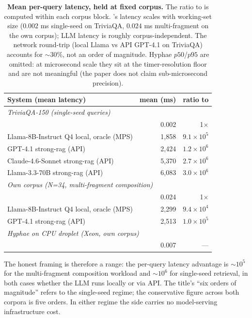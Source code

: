 \begin{table}[tb]
\centering
\caption{\textbf{Mean per-query latency, held at fixed corpus.}
The ratio to \hyphae{} is computed within each corpus block.
\hyphae{}'s latency scales with working-set size ($0.002$ ms
single-seed on TriviaQA, $0.024$ ms multi-fragment on the own
corpus); LLM latency is roughly corpus-independent. The
network round-trip (local Llama vs API GPT-4.1 on TriviaQA)
accounts for $\sim 30\%$, not an order of magnitude. Hyphae
$p50$/$p95$ are omitted: at microsecond scale they sit at the
timer-resolution floor and are not meaningful (the paper does
not claim sub-microsecond precision).}
\label{tab:lat-honest}
\small
\begin{tabular}{l r r}
\toprule
\textbf{System (mean latency)} & mean (ms) & ratio to \hyphae{} \\
\midrule
\multicolumn{3}{l}{\textit{TriviaQA-150 (single-seed queries)}} \\
\hyphae{}                                   &     0.002 & 1$\times$ \\
Llama-8B-Instruct Q4 local, oracle (MPS)    & 1{,}858   & $9.1\times10^5$ \\
GPT-4.1 strong-rag (API)                    & 2{,}424   & $1.2\times10^6$ \\
Claude-4.6-Sonnet strong-rag (API)          & 5{,}370   & $2.7\times10^6$ \\
Llama-3.3-70B strong-rag (API)              & 6{,}083   & $3.0\times10^6$ \\
\midrule
\multicolumn{3}{l}{\textit{Own corpus (N=34, multi-fragment composition)}} \\
\hyphae{}                                   &     0.024 & 1$\times$ \\
Llama-8B-Instruct Q4 local, oracle (MPS)    & 2{,}299   & $9.4\times10^4$ \\
GPT-4.1 strong-rag (API)                    & 2{,}513   & $1.0\times10^5$ \\
\midrule
\multicolumn{3}{l}{\textit{Hyphae on CPU droplet (Xeon, own corpus)}} \\
\hyphae{}                                   &     0.007 & --- \\
\bottomrule
\end{tabular}
\end{table}

The honest framing is therefore a range: the per-query latency
advantage is $\sim 10^5$ for the multi-fragment composition
workload and $\sim 10^6$ for single-seed retrieval, in both cases
whether the LLM runs locally or via API. The title's
``six orders of magnitude'' refers to the single-seed regime;
the conservative figure across both corpora is five orders. In
either regime the \hyphae{} side carries no model-serving
infrastructure cost.


